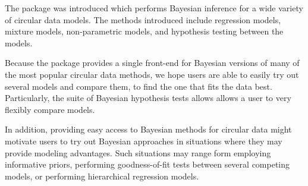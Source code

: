 \label{secjss:discussion}

The  package  was introduced which performs
Bayesian inference for a wide variety of circular data models. The
methods introduced include regression models, mixture models,
non-parametric models, and hypothesis testing between the models.

Because the package provides a single front-end for Bayesian versions of
many of the most popular circular data methods, we hope users are able
to easily try out several models and compare them, to find the one that
fits the data best. Particularly, the suite of Bayesian hypothesis tests
allows allows a user to very flexibly compare models.

In addition, providing easy access to Bayesian methods for circular data
might motivate users to try out Bayesian approaches in situations where
they may provide modeling advantages. Such situations may range form
employing informative priors, performing goodness-of-fit tests between
several competing models, or performing hierarchical regression models.


